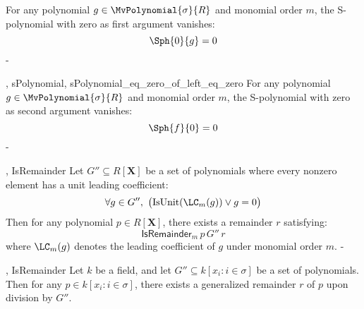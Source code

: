 \begin{lemma}\label{sPolynomial_eq_zero_of_left_eq_zero}
  \leanok
  For any polynomial $g \in \MvPolynomial{\sigma}{R}$ and monomial order $m$,
the S-polynomial with zero as first argument vanishes:
\[
\Sph{0}{g} = 0
\]
-
\end{lemma}

\begin{lemma}\label{sPolynomial_eq_zero_of_right_eq_zero'}
  \leanok
  ,
{sPolynomial},
{sPolynomial_eq_zero_of_left_eq_zero}
  For any polynomial $g \in \MvPolynomial{\sigma}{R}$ and monomial order $m$,
the S-polynomial with zero as second argument vanishes:
\[
\Sph{f}{0} = 0
\]
-
\end{lemma}

\begin{lemma}\label{div_set'}
  \leanok
  ,
{IsRemainder}
  Let $G'' \subseteq R[\mathbf{X}]$ be a set of polynomials where every nonzero element has a unit leading coefficient:
\[
\forall g \in G'',\ \big(\mathrm{IsUnit}(\LC_m(g)) \lor g = 0\big)
\]
Then for any polynomial $p \in R[\mathbf{X}]$, there exists a remainder $r$ satisfying:
\[
\mathsf{IsRemainder}_m\,p\,G''\,r
\]
where $\LC_m(g)$ denotes the leading coefficient of $g$ under monomial order $m$.
-
\end{lemma}

\begin{lemma}\label{div_set''}
  \leanok
  ,
{IsRemainder}
  Let \( k \) be a field, and let \( G'' \subseteq k[x_i : i \in \sigma] \) be a set of polynomials.
Then for any \( p \in k[x_i : i \in \sigma] \), there exists a generalized remainder \( r \) of \( p \) upon division by \( G'' \).

\end{lemma}

\begin{lemma}\label{mem_span_iff}



\end{lemma}

\begin{lemma}\label{mem_span_iff'}



\end{lemma}

